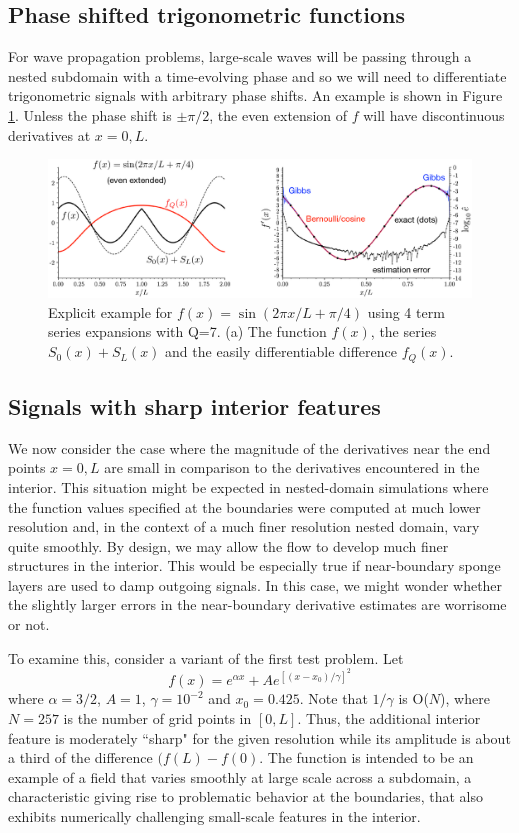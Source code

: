 \documentclass{jfm-like}
\begin{document}
\subsection{Phase shifted trigonometric functions}
For wave propagation problems, large-scale waves will be passing through a nested subdomain with a time-evolving phase and so we will need to differentiate trigonometric signals with arbitrary phase shifts. An example is
shown in Figure \ref{fig:trig}. Unless the phase shift is $\pm \pi/2$, the even extension of $f$ will have discontinuous derivatives at $x=0,L$.
 \begin{figure}
  \centerline{\includegraphics[width=1.0\textwidth]{FIGS/trig_figs/trig_fig.eps}}
  \caption{Explicit example for $f(x)=\sin(2\pi x/L + \pi/4)$ using 4 term series expansions with Q=7. (a) The function $f(x)$, the series $S_0(x)+S_L(x)$ and the easily differentiable difference $f_Q(x)$.}
   \label{fig:trig}
\end{figure}

\subsection{Signals with sharp interior features}
We now consider the case where the magnitude of the derivatives near the end points $x=0,L$ are small in comparison to the derivatives encountered in the interior. This situation might be expected in nested-domain
simulations where the function values specified at the boundaries were computed at much lower resolution and, in the context of a much finer resolution nested domain, vary quite smoothly. By design, we may allow
the flow to develop much finer structures in the interior. This would be especially true if near-boundary sponge layers are used to damp outgoing signals. In this case, we might wonder whether the slightly larger errors
in the near-boundary derivative estimates are worrisome or not. 

To examine this, consider a variant of the first test problem. Let
\begin{equation}
f(x) = e^{\alpha x} + A e^{[(x-x_0)/\gamma]^2} 
\end{equation}
where  $\alpha=3/2$, $A=1$, $\gamma=10^{-2}$  and $x_0=0.425$. Note that $1/\gamma$ is O($N$), where $N=257$ is the number of grid points in $[0,L]$. Thus, the additional interior feature is moderately ``sharp"
for the given resolution while its amplitude is about a third of the difference $(f(L)-f(0)$. The function is intended to be an example of a field that varies smoothly at large scale across a subdomain, a characteristic giving rise
to problematic behavior at the boundaries, that also exhibits numerically challenging small-scale features in the interior.
\end{document}
